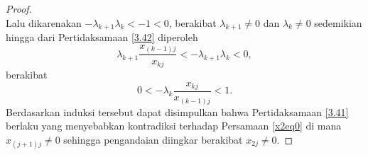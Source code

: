 \begin{proof}
\begin{equation}
    \end{equation}
    Lalu dikarenakan $-\lambda_{k+1}\lambda_{k} < -1 < 0$, berakibat $\lambda_{k+1} \neq 0$ dan $\lambda_{k} \neq 0$ sedemikian hingga dari Pertidaksamaan \eqref{3.42} diperoleh
    \begin{equation*}
        \lambda_{k+1}\frac{x_{(k-1)j}}{x_{kj}} < -\lambda_{k+1}\lambda_{k} < 0,
    \end{equation*}
    berakibat
    \begin{equation*}
        0 < -\lambda_{k}\frac{x_{kj}}{x_{(k-1)j}} < 1.
    \end{equation*}
    Berdasarkan induksi tersebut dapat disimpulkan bahwa Pertidaksamaan \eqref{3.41} berlaku yang menyebabkan kontradiksi terhadap Persamaan \eqref{x2eq0} di mana $x_{(j+1)j} \neq 0$ sehingga pengandaian diingkar berakibat $x_{2j} \neq 0$.


\end{proof}
